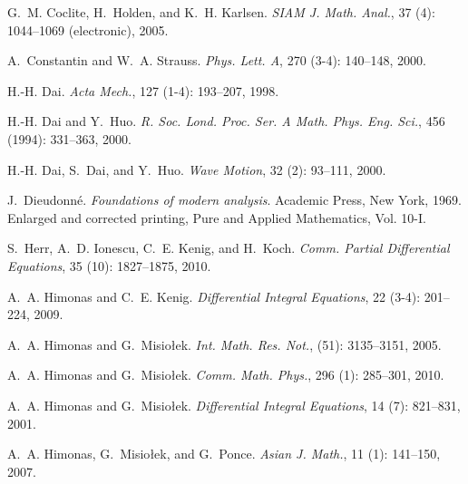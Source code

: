 \documentclass[final,noinfo]{nddiss2e}
\begin{document}
\begin{thebibliography}{35}
G.~M. Coclite, H.~Holden, and K.~H. Karlsen.
\newblock \emph{SIAM J. Math. Anal.}, 37 (4): 1044--1069
  (electronic), 2005.

A.~Constantin and W.~A. Strauss.
\newblock \emph{Phys. Lett. A}, 270 (3-4): 140--148, 2000.

H.-H. Dai.
\newblock \emph{Acta Mech.}, 127 (1-4): 193--207, 1998.

H.-H. Dai and Y.~Huo.
\newblock \emph{R. Soc. Lond. Proc. Ser. A Math. Phys. Eng. Sci.}, 456
  (1994): 331--363, 2000.

H.-H. Dai, S.~Dai, and Y.~Huo.
\newblock \emph{Wave Motion}, 32 (2): 93--111, 2000.

J.~Dieudonn{{\'e}}.
\newblock \emph{Foundations of modern analysis}.
\newblock Academic Press, New York, 1969.
\newblock Enlarged and corrected printing, Pure and Applied Mathematics, Vol.
  10-I.

S.~Herr, A.~D. Ionescu, C.~E. Kenig, and H.~Koch.
\newblock \emph{Comm. Partial Differential Equations}, 35
  (10): 1827--1875, 2010.

A.~A. Himonas and C.~E. Kenig.
\newblock \emph{Differential Integral Equations}, 22 (3-4):
  201--224, 2009.

A.~A. Himonas and G.~Misio{\l}ek.
\newblock \emph{Int. Math. Res. Not.},  (51): 3135--3151,
  2005.

A.~A. Himonas and G.~Misio{\l}ek.
\newblock \emph{Comm. Math. Phys.}, 296 (1): 285--301, 2010.

A.~A. Himonas and G.~Misio{\l}ek.
\newblock \emph{Differential Integral Equations}, 14 (7):
  821--831, 2001.

A.~A. Himonas, G.~Misio{\l}ek, and G.~Ponce.
\newblock \emph{Asian J. Math.}, 11 (1): 141--150, 2007.


\end{thebibliography}
\end{document}
